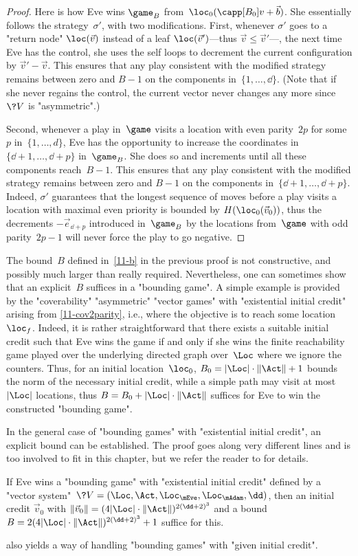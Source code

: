 \begin{proof}
  Here is how Eve wins $\game_B$ from~$\loc_0(\capp[B_0]v+\vec b)$.
  She essentially follows the strategy~$\sigma'$, with two
  modifications.  First, whenever $\sigma'$ goes to a "return node"
  $\loc(\vec v)$ instead of a leaf $\loc(\vec v')$---thus $\vec
  v\leq\vec v'$---, the next time Eve has the control, she uses the
  self loops to decrement the current configuration by $\vec v'-\vec
  v$.  This ensures that any play consistent with the modified
  strategy remains between zero and $B-1$ on the components
  in~$\{1,\dots,\dd\}$.  (Note that if she never regains the control,
  the current vector never changes any more since~$\?V$ is
  "asymmetric".)

  Second, whenever a play in~$\game$ visits a location with even
  parity~$2p$ for some~$p$ in~$\{1,\dots,d\}$, Eve has the opportunity
  to increase the coordinates in~$\{\dd+1,\dots,\dd+p\}$ in~$\game_B$.
  She does so and increments until all these components reach~$B-1$.
  This ensures that any play consistent with the modified strategy
  remains between zero and $B-1$ on the components
  in~$\{\dd+1,\dots,\dd+p\}$.  Indeed, $\sigma'$ guarantees that the
  longest sequence of moves before a play visits a location with
  maximal even priority is bounded by $H(\loc_0(\vec v_0))$, thus the
  decrements $-\vec e_{\dd+p}$ introduced in~$\game_B$ by the
  locations from~$\game$ with odd parity~$2p-1$ will never force the
  play to go negative.
\end{proof}

The bound~$B$ defined in~\cref{11-b} in the previous proof is not
constructive, and possibly much larger than really required.
Nevertheless, one can sometimes show that an explicit~$B$ suffices in
a "bounding game".
A simple example is provided by the "coverability" "asymmetric"
"vector games" with "existential initial credit" arising from
\cref{11-cov2parity}, i.e., where the objective is to reach some
location~$\loc_f$.  Indeed, it is rather straightforward that there
exists a suitable initial credit such that Eve wins the game if and
only if she wins the finite reachability game played over the
underlying directed graph over~$\Loc$ where we ignore the counters.
Thus, for an initial location~$\loc_0$, $B_0=|\Loc|\cdot\|\Act\|+1$
bounds the norm of the necessary initial credit, while a simple path
may visit at most~$|\Loc|$ locations, thus
$B=B_0+|\Loc|\cdot\|\Act\|$ suffices for Eve to win the constructed
"bounding game".

In the general case of "bounding games" with "existential initial
credit", an explicit bound can be established.  The proof goes
along very different lines and is too involved to fit in this chapter,
but we refer the reader
to \cite{Jurdzinski&Lazic&Schmitz:2015,Colcombet&Jurdzinski&Lazic&Schmitz:2017}
for details.
\begin{theorem}\label{11-th-bounding}
  If Eve wins a "bounding game" with "existential initial credit"
  defined by a "vector
  system"~$\?V=(\Loc,\Act,\Loc_\mEve,\Loc_\mAdam,\dd)$, then an
  initial credit $\vec v_0$ with $\|\vec
  v_0\|=(4|\Loc|\cdot\|\Act\|)^{2(\dd+2)^3}$ and a bound
  $B=2(4|\Loc|\cdot\|\Act\|)^{2(\dd+2)^3}+1$ suffice for this.
\end{theorem}

 also yields a way of handling "bounding games"
with "given initial credit".  
  
